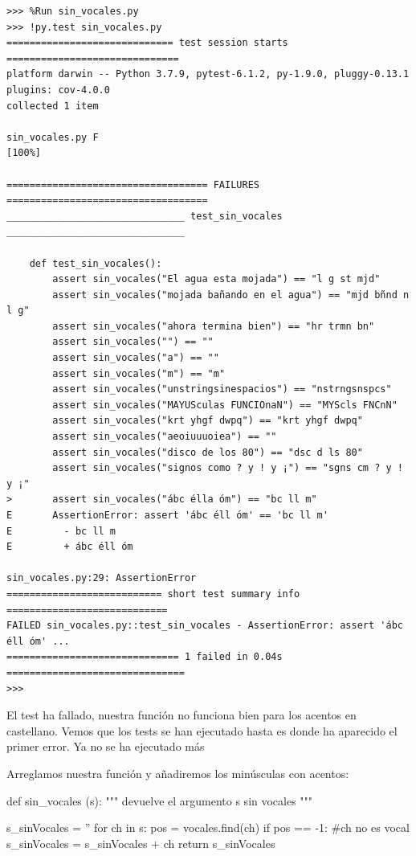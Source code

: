 \begin{footnotesize}
\begin{Verbatim}[frame=single]
>>> %Run sin_vocales.py
>>> !py.test sin_vocales.py
============================= test session starts ==============================
platform darwin -- Python 3.7.9, pytest-6.1.2, py-1.9.0, pluggy-0.13.1
plugins: cov-4.0.0
collected 1 item

sin_vocales.py F                                                         [100%]

=================================== FAILURES ===================================
_______________________________ test_sin_vocales _______________________________

    def test_sin_vocales():
        assert sin_vocales("El agua esta mojada") == "l g st mjd"
        assert sin_vocales("mojada bañando en el agua") == "mjd bñnd n l g"
        assert sin_vocales("ahora termina bien") == "hr trmn bn"
        assert sin_vocales("") == ""
        assert sin_vocales("a") == ""
        assert sin_vocales("m") == "m"
        assert sin_vocales("unstringsinespacios") == "nstrngsnspcs"
        assert sin_vocales("MAYUSculas FUNCIOnaN") == "MYScls FNCnN"
        assert sin_vocales("krt yhgf dwpq") == "krt yhgf dwpq"
        assert sin_vocales("aeoiuuuoiea") == ""
        assert sin_vocales("disco de los 80") == "dsc d ls 80"
        assert sin_vocales("signos como ? y ! y ¡") == "sgns cm ? y ! y ¡"
>       assert sin_vocales("ábc élla óm") == "bc ll m"
E       AssertionError: assert 'ábc éll óm' == 'bc ll m'
E         - bc ll m
E         + ábc éll óm

sin_vocales.py:29: AssertionError
=========================== short test summary info ============================
FAILED sin_vocales.py::test_sin_vocales - AssertionError: assert 'ábc éll óm' ...
============================== 1 failed in 0.04s ===============================
>>> 
\end{Verbatim}
\end{footnotesize}


El test ha fallado, nuestra función  no funciona bien para los acentos en castellano. Vemos que los tests se han ejecutado hasta   es donde ha aparecido el primer error. Ya no se ha ejecutado más 

Arreglamos nuestra función y añadiremos los minúsculas con acentos:


\begin{python}
def sin_vocales (s):
    """
    devuelve el argumento s sin vocales
    """

    s_sinVocales = ''
    for ch in s:
        pos = vocales.find(ch)
        if pos == -1: #ch no es vocal
            s_sinVocales = s_sinVocales + ch     
    return s_sinVocales
\end{python}


